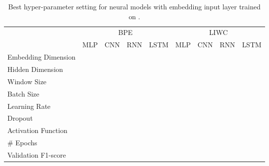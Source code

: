 \begin{landscape}
\begin{table}[]
\centering
\begin{tabular}{l|llll|llll}
                      & \multicolumn{4}{c|}{BPE}                 & \multicolumn{4}{c}{LIWC} \\
                       & MLP     & CNN      & RNN     & LSTM    & MLP     & CNN     & RNN     & LSTM     \\ \hline
Embedding Dimension    &         &          &         &         &         &         &         &          \\
Hidden Dimension       &         &          &         &         &         &         &         &          \\
Window Size            &         &          &         &         &         &         &         &          \\
Batch Size             &         &          &         &         &         &         &         &          \\
Learning Rate          &         &          &         &         &         &         &         &          \\
Dropout                &         &          &         &         &         &         &         &          \\
Activation Function    &         &          &         &         &         &         &         &          \\
\# Epochs               &         &          &         &         &         &         &         &          \\
Validation F1-score    &         &          &         &         &         &         &         &
\end{tabular}
\caption{Best hyper-parameter setting for neural models with embedding input layer trained on \citet{Davidson:2017}.}
\label{tab:redux_hyperparam_search_davidson}
\end{table}
\end{landscape}


